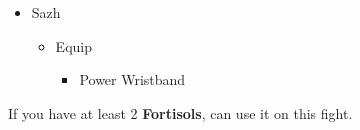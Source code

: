\begin{menu}
\begin{itemize}
\begin{itemize}
\begin{itemize}
\begin{itemize}
            \end{itemize}
        \end{itemize}
        \item Sazh
        \begin{itemize}
            \item Equip
            \begin{itemize}
                \item Power Wristband
            \end{itemize}
        \end{itemize}
    \end{itemize}
\end{itemize}
\end{menu}

\renewcommand{\first}{[1] Slash \& Burn (\rav/\com)}
\renewcommand{\second}{[2] Tide Turner (\sab/\syn)}
\renewcommand{\third}{[3] Tide Turner (\sab/\syn)}
\renewcommand{\fourth}{[4] Dualcasting (\rav/\rav)}
\renewcommand{\fifth}{[5] Undermine (\sab/\rav)}
\renewcommand{\sixth}{[6] Divide \& Conquer (\sab/\com)}
\newpage
If you have at least 2 \textbf{Fortisols}, can use it on this fight.
